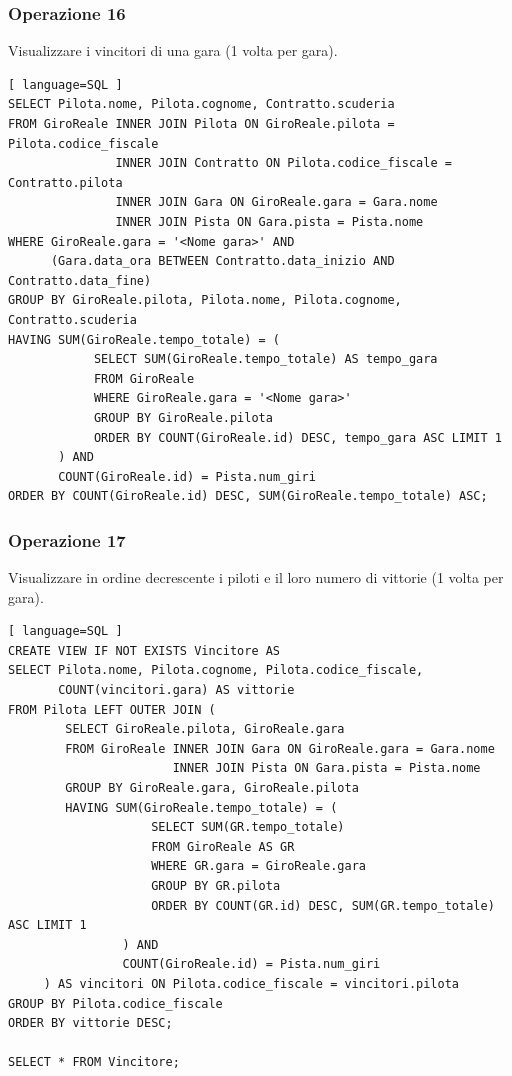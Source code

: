\documentclass[11pt]{article}
\begin{document}
\subsubsection{Operazione 16}
Visualizzare i vincitori di una gara (1 volta per gara).
\begin{lstlisting}[ language=SQL ]
SELECT Pilota.nome, Pilota.cognome, Contratto.scuderia
FROM GiroReale INNER JOIN Pilota ON GiroReale.pilota = Pilota.codice_fiscale
               INNER JOIN Contratto ON Pilota.codice_fiscale = Contratto.pilota
               INNER JOIN Gara ON GiroReale.gara = Gara.nome
               INNER JOIN Pista ON Gara.pista = Pista.nome
WHERE GiroReale.gara = '<Nome gara>' AND
      (Gara.data_ora BETWEEN Contratto.data_inizio AND Contratto.data_fine)
GROUP BY GiroReale.pilota, Pilota.nome, Pilota.cognome, Contratto.scuderia
HAVING SUM(GiroReale.tempo_totale) = (
            SELECT SUM(GiroReale.tempo_totale) AS tempo_gara
            FROM GiroReale
            WHERE GiroReale.gara = '<Nome gara>'
            GROUP BY GiroReale.pilota
            ORDER BY COUNT(GiroReale.id) DESC, tempo_gara ASC LIMIT 1
       ) AND
       COUNT(GiroReale.id) = Pista.num_giri
ORDER BY COUNT(GiroReale.id) DESC, SUM(GiroReale.tempo_totale) ASC;
\end{lstlisting}


\subsubsection{Operazione 17}
Visualizzare in ordine decrescente i piloti e il loro numero di vittorie (1 volta per gara).
\begin{lstlisting}[ language=SQL ]
CREATE VIEW IF NOT EXISTS Vincitore AS
SELECT Pilota.nome, Pilota.cognome, Pilota.codice_fiscale, 
       COUNT(vincitori.gara) AS vittorie
FROM Pilota LEFT OUTER JOIN (
        SELECT GiroReale.pilota, GiroReale.gara
        FROM GiroReale INNER JOIN Gara ON GiroReale.gara = Gara.nome
                       INNER JOIN Pista ON Gara.pista = Pista.nome
        GROUP BY GiroReale.gara, GiroReale.pilota
        HAVING SUM(GiroReale.tempo_totale) = (
                    SELECT SUM(GR.tempo_totale)
                    FROM GiroReale AS GR
                    WHERE GR.gara = GiroReale.gara
                    GROUP BY GR.pilota
                    ORDER BY COUNT(GR.id) DESC, SUM(GR.tempo_totale) ASC LIMIT 1
                ) AND
                COUNT(GiroReale.id) = Pista.num_giri
     ) AS vincitori ON Pilota.codice_fiscale = vincitori.pilota
GROUP BY Pilota.codice_fiscale
ORDER BY vittorie DESC;

SELECT * FROM Vincitore;
\end{lstlisting}
\end{document}
